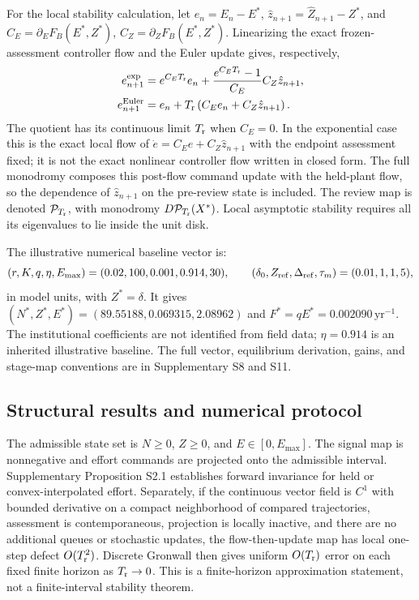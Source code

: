 For the local stability calculation, let \(e_n=E_n-E^*\), \(\hat z_{n+1}=\widehat Z_{n+1}-Z^*\), and \(C_E=\partial_EF_B(E^*,Z^*)\), \(C_Z=\partial_ZF_B(E^*,Z^*)\). Linearizing the exact frozen-assessment controller flow and the Euler update gives, respectively,
\begin{align}
e_{n+1}^{\rm exp}&=e^{C_ET_{\mathrm r}}e_n+\frac{e^{C_ET_{\mathrm r}}-1}{C_E}C_Z\hat z_{n+1},\\
e_{n+1}^{\rm Euler}&=e_n+T_{\mathrm r}\left(C_Ee_n+C_Z\hat z_{n+1}\right).
\end{align}
The quotient has its continuous limit \(T_{\mathrm r}\) when \(C_E=0\). In the exponential case this is the exact local flow of \(\dot e=C_Ee+C_Z\hat z_{n+1}\) with the endpoint assessment fixed; it is not the exact nonlinear controller flow written in closed form. The full monodromy composes this post-flow command update with the held-plant flow, so the dependence of \(\hat z_{n+1}\) on the pre-review state is included. The review map is denoted \(\mathcal P_{T_{\mathrm r}}\), with monodromy \(D\mathcal P_{T_{\mathrm r}}(X^*)\). Local asymptotic stability requires all its eigenvalues to lie inside the unit disk.

The illustrative numerical baseline vector is:
\[
(r,K,q,\eta,E_{\max})=(0.02,100,0.001,0.914,30),\qquad
(\delta_0,Z_{\rm ref},\Delta_{\rm ref},\tau_m)=(0.01,1,1,5),
\]
in model units, with \(Z^*=\delta\). It gives \((N^*,Z^*,E^*)=(89.55188,0.069315,2.08962)\) and \(F^*=qE^*=0.002090\,\mathrm{yr}^{-1}\). The institutional coefficients are not identified from field data; \(\eta=0.914\) is an inherited illustrative baseline. The full vector, equilibrium derivation, gains, and stage-map conventions are in Supplementary S8 and S11.

\subsection{Structural results and numerical protocol}\label{sec:structural-methods}

The admissible state set is \(N\geq0\), \(Z\geq0\), and \(E\in[0,E_{\max}]\). The signal map is nonnegative and effort commands are projected onto the admissible interval. Supplementary Proposition S2.1 establishes forward invariance for held or convex-interpolated effort. Separately, if the continuous vector field is \(C^1\) with bounded derivative on a compact neighborhood of compared trajectories, assessment is contemporaneous, projection is locally inactive, and there are no additional queues or stochastic updates, the flow-then-update map has local one-step defect \(O(T_{\mathrm r}^2)\). Discrete Gronwall then gives uniform \(O(T_{\mathrm r})\) error on each fixed finite horizon as \(T_{\mathrm r}\to0\). This is a finite-horizon approximation statement, not a finite-interval stability theorem.


